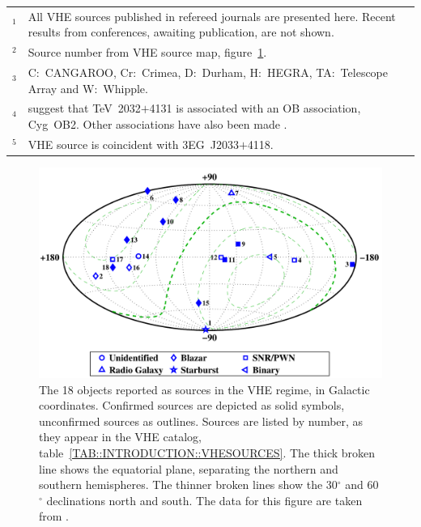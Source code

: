 \begin{table}[t]
\begin{centering}
\footnotesize
\begin{tabular}{lp{}}
$^1$ & All VHE sources published in refereed journals are presented
here. Recent results from conferences, awaiting publication, are not
shown.\\ $^2$ & Source number from VHE source map,
figure~\ref{FIG::INTRODUCTION::VHECATALOG}.\\ $^3$ & C:~CANGAROO,
Cr:~Crimea, D:~Durham, H:~HEGRA, TA:~Telescope Array and W:~Whipple.\\
$^4$ & \citet{REF::BUTT::APJ2003} suggest that TeV~2032$+$4131 is
associated with an OB association, Cyg~OB2. Other associations have
also been made \citep{REF::MUKHERJEE::APJ2003}. \\
$^5$ & VHE source is coincident with 3EG~J2033$+$4118.
\end{tabular}
\end{centering}
\end{table}

\begin{figure}[t]
\includegraphics[angle=270,width=\textwidth]{plots/chap-introduction/tev_catalog.pdf}
\caption{\label{FIG::INTRODUCTION::VHECATALOG} 
The 18 objects reported as \Gray sources in the VHE regime, in
Galactic coordinates. Confirmed sources are depicted as solid symbols,
unconfirmed sources as outlines. Sources are listed by number, as they
appear in the VHE catalog, table~\ref{TAB::INTRODUCTION::VHESOURCES}. The
thick broken line shows the equatorial plane, separating the northern
and southern hemispheres. The thinner broken lines show the 30$^\circ$
and 60$^\circ$ declinations north and south. The data for this figure
are taken from \citet{REF::HORAN_WEEKES::2NDVERITAS2004}.}
\end{figure}

